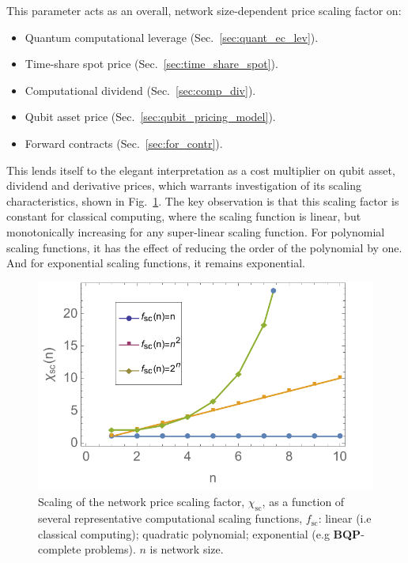 \documentclass[aps, rmp, twocolumn, amsmath, amssymb, nofootinbib, superscriptaddress, longbibliography, floatfix, table-of-contents, eqsecnum]{revtex4-1}
\begin{document}
This parameter acts as an overall, network size-dependent price scaling factor on:
\begin{itemize}
\item Quantum computational leverage (Sec.~\ref{sec:quant_ec_lev}).
\item Time-share spot price (Sec.~\ref{sec:time_share_spot}).
\item Computational dividend (Sec.~\ref{sec:comp_div}).
\item Qubit asset price (Sec.~\ref{sec:qubit_pricing_model}).
\item Forward contracts (Sec.~\ref{sec:for_contr}).
\end{itemize}

This lends itself to the elegant interpretation as a cost multiplier on qubit asset, dividend and derivative prices, which warrants investigation of its scaling characteristics, shown in Fig.~\ref{fig:NPSF}. The key observation is that this scaling factor is constant for classical computing, where the scaling function is linear, but monotonically increasing for any super-linear scaling function. For polynomial scaling functions, it has the effect of reducing the order of the polynomial by one. And for exponential scaling functions, it remains exponential.

\begin{figure}[htb!]
	\includegraphics[width=\columnwidth]{network_price_scaling_factor}
	\caption{Scaling of the network price scaling factor, $\chi_\text{sc}$, as a function of several representative computational scaling functions, $f_\text{sc}$: linear (i.e classical computing); quadratic polynomial; exponential (e.g \textbf{BQP}-complete problems). $n$ is network size.} \label{fig:NPSF}
\end{figure}
\end{document}
